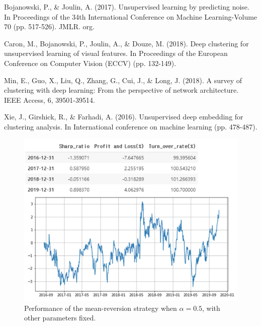 \documentclass[11pt]{article}
\begin{document}


\newpage


\begin{description}

\item Bojanowski, P., \& Joulin, A. (2017). Unsupervised learning by predicting noise. In Proceedings of the 34th International Conference on Machine Learning-Volume 70 (pp. 517-526). JMLR. org.

\item Caron, M., Bojanowski, P., Joulin, A., \& Douze, M. (2018). Deep clustering for unsupervised learning of visual features. In Proceedings of the European Conference on Computer Vision (ECCV) (pp. 132-149).

\item Min, E., Guo, X., Liu, Q., Zhang, G., Cui, J., \& Long, J. (2018). A survey of clustering with deep learning: From the perspective of network architecture. IEEE Access, 6, 39501-39514.

\item Xie, J., Girshick, R., \& Farhadi, A. (2016). Unsupervised deep embedding for clustering analysis. In International conference on machine learning (pp. 478-487).



\end{description}




\newpage

\begin{figure}
    \centering
    \includegraphics[width=\textwidth/4*3]{images/aaa.png}
    \caption{Performance of the mean-reversion strategy when $\alpha= 0.5$, with other parameters fixed.}
    \label{bigalpha}
    \vspace*{-5mm}
\end{figure}
\end{document}
